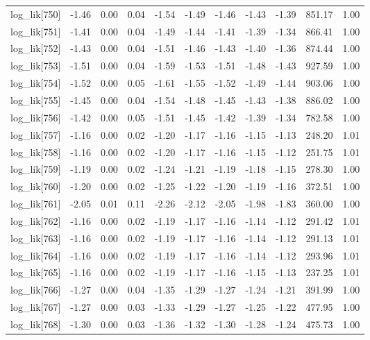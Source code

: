 \begin{table}[ht]
\begin{tabular}{rrrrrrrrrrr}
  log\_lik[750] & -1.46 & 0.00 & 0.04 & -1.54 & -1.49 & -1.46 & -1.43 & -1.39 & 851.17 & 1.00 \\ 
  log\_lik[751] & -1.41 & 0.00 & 0.04 & -1.49 & -1.44 & -1.41 & -1.39 & -1.34 & 866.41 & 1.00 \\ 
  log\_lik[752] & -1.43 & 0.00 & 0.04 & -1.51 & -1.46 & -1.43 & -1.40 & -1.36 & 874.44 & 1.00 \\ 
  log\_lik[753] & -1.51 & 0.00 & 0.04 & -1.59 & -1.53 & -1.51 & -1.48 & -1.43 & 927.59 & 1.00 \\ 
  log\_lik[754] & -1.52 & 0.00 & 0.05 & -1.61 & -1.55 & -1.52 & -1.49 & -1.44 & 903.06 & 1.00 \\ 
  log\_lik[755] & -1.45 & 0.00 & 0.04 & -1.54 & -1.48 & -1.45 & -1.43 & -1.38 & 886.02 & 1.00 \\ 
  log\_lik[756] & -1.42 & 0.00 & 0.05 & -1.51 & -1.45 & -1.42 & -1.39 & -1.34 & 782.58 & 1.00 \\ 
  log\_lik[757] & -1.16 & 0.00 & 0.02 & -1.20 & -1.17 & -1.16 & -1.15 & -1.13 & 248.20 & 1.01 \\ 
  log\_lik[758] & -1.16 & 0.00 & 0.02 & -1.20 & -1.17 & -1.16 & -1.15 & -1.12 & 251.75 & 1.01 \\ 
  log\_lik[759] & -1.19 & 0.00 & 0.02 & -1.24 & -1.21 & -1.19 & -1.18 & -1.15 & 278.30 & 1.00 \\ 
  log\_lik[760] & -1.20 & 0.00 & 0.02 & -1.25 & -1.22 & -1.20 & -1.19 & -1.16 & 372.51 & 1.00 \\ 
  log\_lik[761] & -2.05 & 0.01 & 0.11 & -2.26 & -2.12 & -2.05 & -1.98 & -1.83 & 360.00 & 1.00 \\ 
  log\_lik[762] & -1.16 & 0.00 & 0.02 & -1.19 & -1.17 & -1.16 & -1.14 & -1.12 & 291.42 & 1.01 \\ 
  log\_lik[763] & -1.16 & 0.00 & 0.02 & -1.19 & -1.17 & -1.16 & -1.14 & -1.12 & 291.13 & 1.01 \\ 
  log\_lik[764] & -1.16 & 0.00 & 0.02 & -1.19 & -1.17 & -1.16 & -1.14 & -1.12 & 293.96 & 1.01 \\ 
  log\_lik[765] & -1.16 & 0.00 & 0.02 & -1.19 & -1.17 & -1.16 & -1.15 & -1.13 & 237.25 & 1.01 \\ 
  log\_lik[766] & -1.27 & 0.00 & 0.04 & -1.35 & -1.29 & -1.27 & -1.24 & -1.21 & 391.99 & 1.00 \\ 
  log\_lik[767] & -1.27 & 0.00 & 0.03 & -1.33 & -1.29 & -1.27 & -1.25 & -1.22 & 477.95 & 1.00 \\ 
  log\_lik[768] & -1.30 & 0.00 & 0.03 & -1.36 & -1.32 & -1.30 & -1.28 & -1.24 & 475.73 & 1.00 \\ 

\end{tabular}
\end{table}
